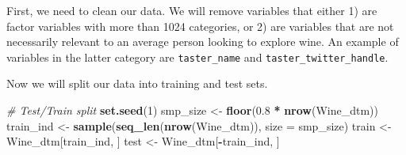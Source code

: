 \documentclass[12pt,twoside]{amherstthesis}
\newenvironment{Shaded}{\begin{snugshade}}{\end{snugshade}}
\newcommand{\KeywordTok}[1]{\textcolor[rgb]{0.13,0.29,0.53}{\textbf{#1}}}
\newcommand{\DataTypeTok}[1]{\textcolor[rgb]{0.13,0.29,0.53}{#1}}
\newcommand{\DecValTok}[1]{\textcolor[rgb]{0.00,0.00,0.81}{#1}}
\newcommand{\FloatTok}[1]{\textcolor[rgb]{0.00,0.00,0.81}{#1}}
\newcommand{\StringTok}[1]{\textcolor[rgb]{0.31,0.60,0.02}{#1}}
\newcommand{\CommentTok}[1]{\textcolor[rgb]{0.56,0.35,0.01}{\textit{#1}}}
\newcommand{\OperatorTok}[1]{\textcolor[rgb]{0.81,0.36,0.00}{\textbf{#1}}}
\newcommand{\NormalTok}[1]{#1}
\begin{document}
First, we need to clean our data. We will remove variables that either
1) are factor variables with more than 1024 categories, or 2) are
variables that are not necessarily relevant to an average person looking
to explore wine. An example of variables in the latter category are
\texttt{taster\_name} and \texttt{taster\_twitter\_handle}.
\begin{Shaded}
\end{Shaded}
Now we will split our data into training and test sets.
\begin{Shaded}
\begin{Highlighting}[]
\CommentTok{# Test/Train split}
\KeywordTok{set.seed}\NormalTok{(}\DecValTok{1}\NormalTok{)}
\NormalTok{smp_size <-}\StringTok{ }\KeywordTok{floor}\NormalTok{(}\FloatTok{0.8} \OperatorTok{*}\StringTok{ }\KeywordTok{nrow}\NormalTok{(Wine_dtm))}
\NormalTok{train_ind <-}\StringTok{ }\KeywordTok{sample}\NormalTok{(}\KeywordTok{seq_len}\NormalTok{(}\KeywordTok{nrow}\NormalTok{(Wine_dtm)), }\DataTypeTok{size =}\NormalTok{ smp_size)}
\NormalTok{train <-}\StringTok{ }\NormalTok{Wine_dtm[train_ind, ]}
\NormalTok{test <-}\StringTok{ }\NormalTok{Wine_dtm[}\OperatorTok{-}\NormalTok{train_ind, ]}
\end{Highlighting}
\end{Shaded}
\end{document}
